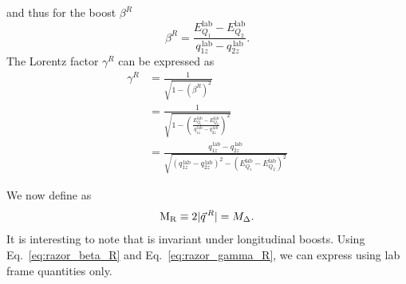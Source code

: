 and thus for the boost $\beta^R$
\begin{equation}
  \beta^R = \frac{E_{Q_1}^{\textrm{lab}} - E_{Q_2}^{\textrm{lab}}}{q_{1z}^{\,\textrm{lab}} -
q_{2z}^{\,\textrm{lab}}} . \label{eq:razor_beta_R}
\end{equation}
The Lorentz factor $\gamma^R$ can be expressed as
\begin{align}
  \gamma^R &= \frac{1}{\sqrt{1 - (\beta^R)^2}} \\
	   &= \frac{1}{\sqrt{1 - \left( \frac{E_{Q_1}^{\textrm{lab}} -
E_{Q_2}^{\textrm{lab}}}{q_{1z}^{\,\textrm{lab}} - q_{2z}^{\,\textrm{lab}}} \right)^2}} \\
           &= \frac{ q_{1z}^{\,\textrm{lab}} - q_{2z}^{\,\textrm{lab}} }{\sqrt{ \left(
 q_{1z}^{\,\textrm{lab}} - q_{2z}^{\,\textrm{lab}} \right)^2 - \left(
 E_{Q_1}^{\textrm{lab}} - E_{Q_2}^{\textrm{lab}}\right)^2 }} \label{eq:razor_gamma_R}
\end{align}

We now define \mr as
\begin{equation}
  \mathrm{M_R} \equiv 2 |\vec{q}^{\,R}| = M_\Delta .
\end{equation}
It is interesting to note that \mr is invariant under longitudinal boosts. Using
Eq.~\ref{eq:razor_beta_R} and Eq.~\ref{eq:razor_gamma_R}, we can express \mr using lab frame
quantities only. 

